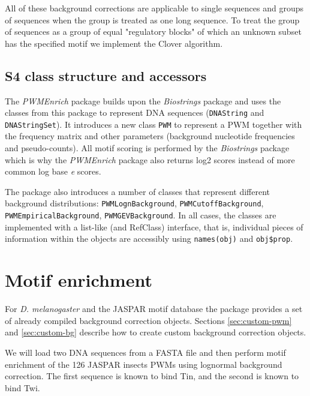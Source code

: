 \documentclass{article}
\newcommand{\Rfun}[1]{{\texttt{#1}}}
\newcommand{\Robj}[1]{{\texttt{#1}}}
\newcommand{\Rpackage}[1]{{\textit{#1}}}
\begin{document}
All of these background corrections are applicable to single sequences and groups of sequences when the group is treated as one long sequence. To treat the group of sequences as a group of equal "regulatory blocks" of which an unknown subset has the specified motif we implement the Clover \citep{frith_detection_2004} algorithm. 

\subsection{S4 class structure and accessors}

The \Rpackage{PWMEnrich} package builds upon the \Rpackage{Biostrings} package and uses the classes from this package to represent DNA sequences (\Robj{DNAString} and \Robj{DNAStringSet}). It introduces a new class \Robj{PWM} to represent a PWM together with the frequency matrix and other parameters (background nucleotide frequencies and pseudo-counts). All motif scoring is performed by the \Rpackage{Biostrings} package which is why the \Rpackage{PWMEnrich} package also returns log2 scores instead of more common log base \textit{e} scores. 

The package also introduces a number of classes that represent different background distributions: \Robj{PWMLognBackground}, \Robj{PWMCutoffBackground}, \Robj{PWMEmpiricalBackground}, \Robj{PWMGEVBackground}. In all cases, the classes are implemented with a list-like (and RefClass) interface, that is, individual pieces of information within the objects are accessibly using \Rfun{names(obj)} and \Rfun{obj\$prop}.

\section{Motif enrichment}

For \textit{D. melanogaster} and the JASPAR motif database \citep{portales2010jaspar} the package provides a set of already compiled background correction objects. Sections \ref{sec:custom-pwm} and \ref{sec:custom-bg} describe how to create custom background correction objects.

We will load two DNA sequences from a FASTA file and then perform motif enrichment of the 126 JASPAR insects PWMs using lognormal background correction. The first sequence is known to bind Tin, and the second is known to bind Twi.  
\end{document}
